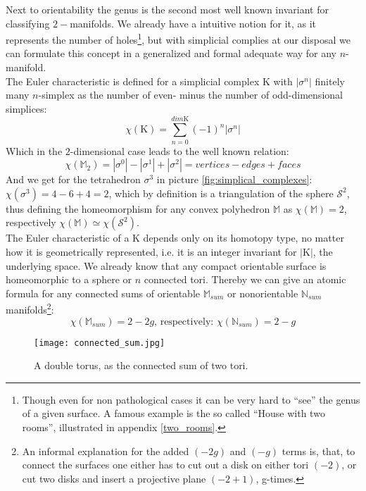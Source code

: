 Next to orientability the genus is the second most well known invariant for classifying $2-$manifolds.
We already have a intuitive notion for it, as it represents the number of holes\footnote{ Though even for non pathological cases it can be very hard to ``see'' the genus of a given surface. A famous example is the so called ``House with two rooms'', illustrated in appendix \ref{two_rooms}.}, but with simplicial complies at our disposal we can formulate this concept in a generalized and formal adequate way for any $n$-manifold.\\
The Euler characteristic is defined for a simplicial complex $\mathrm{K}$ with $|\sigma^{n}|$ finitely many $n$-simplex as the number of even- minus the number of odd-dimensional simplices:
\begin{equation} \label{eq:euler_characteristic}
\chi(\mathrm{K}) = \sum_{n = 0}^{dim \mathrm{K}} (-1)^{n} |\sigma^{n}|
\end{equation}
Which in the $2$-dimensional case leads to the well known relation:
\begin{equation*}
\chi(\mathbb{M}_{2}) = |\sigma^{0}| - |\sigma^{1}| + |\sigma^{2}| = vertices - edges + faces
\end{equation*}
And we get for the tetrahedron $\sigma^{3}$ in picture \ref{fig:simplical_complexes}: $\chi(\sigma^{3}) = 4 - 6 + 4 = 2$, which by definition is a triangulation of the sphere $\mathcal{S}^{2}$, thus defining the homeomorphism for any convex polyhedron $\mathbb{M}$ as $\chi(\mathbb{M}) = 2$, respectively $\chi(\mathbb{M}) \simeq \chi(\mathcal{S}^{2})$.\\
The Euler characteristic of a $\mathrm{K}$ depends only on its homotopy type, no matter how it is geometrically represented, i.e.
it is an integer invariant for $|\mathrm{K}|$, the underlying space.
We already know that any compact orientable surface is homeomorphic to a sphere or $n$ connected tori.
Thereby we can give an atomic formula for any connected sums of orientable $\mathbb{M}_{sum}$ or nonorientable $\mathbb{N}_{sum}$ manifolds\footnote{ An informal explanation for the added $(-2g)$ and $(-g)$ terms is, that, to connect the surfaces one either has to cut out a disk on either tori $(-2)$, or cut two disks and insert a projective plane $(-2+1)$, g-times.}: 
\begin{equation}
\chi(\mathbb{M}_{sum}) = 2 - 2g \text{, respectively: } \chi(\mathbb{N}_{sum}) = 2 - g
\end{equation}
\vspace*{-4ex}
\begin{figure}[ht]
\centering
\texttt{[image: connected\_sum.jpg]}
\caption{A double torus, as the connected sum of two tori.}
\label{fig:connected_sum}
\end{figure}

